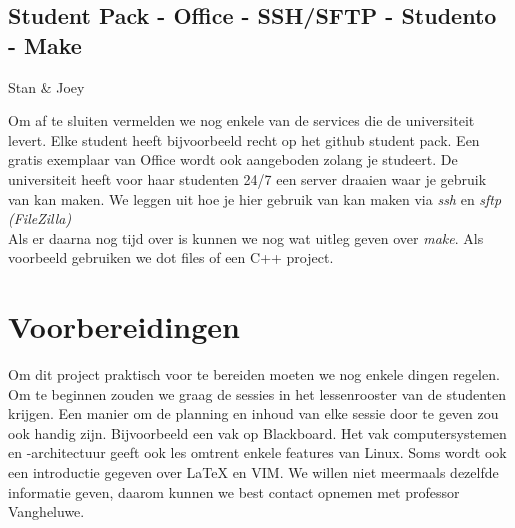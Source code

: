 \documentclass[a4paper]{article}
\begin{document}
		\subsection{Student Pack - Office - SSH/SFTP - Studento - Make}
			\begin{flushright}
				Stan \& Joey
			\end{flushright}
			Om af te sluiten vermelden we nog enkele van de services die de universiteit levert. Elke student heeft bijvoorbeeld recht op het github student pack. Een gratis exemplaar van Office wordt ook aangeboden zolang je studeert. De universiteit heeft voor haar studenten 24/7 een server draaien waar je gebruik van kan maken. We leggen uit hoe je hier gebruik van kan maken via \emph{ssh} en \emph{sftp (FileZilla)} \\
			Als er daarna nog tijd over is kunnen we nog wat uitleg geven over \emph{make}. Als voorbeeld gebruiken we dot files of een C++ project.
			
	\section{Voorbereidingen}
		Om dit project praktisch voor te bereiden moeten we nog enkele dingen regelen. Om te beginnen zouden we graag de sessies in het lessenrooster van de studenten krijgen. Een manier om de planning en inhoud van elke sessie door te geven zou ook handig zijn. Bijvoorbeeld een vak op Blackboard. Het vak computersystemen en -architectuur geeft ook les omtrent enkele features van Linux. Soms wordt ook een introductie gegeven over LaTeX en VIM. We willen niet meermaals dezelfde informatie geven, daarom kunnen we best contact opnemen met professor Vangheluwe.
		
\end{document}
